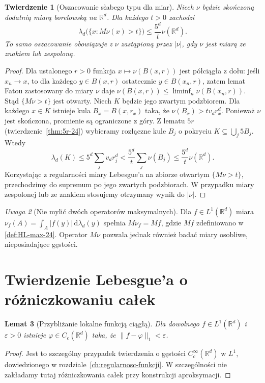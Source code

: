 \documentclass[11pt,a4paper,oneside]{book}
\numberwithin{equation}{chapter}
\theoremstyle{plain}
\newtheorem{twierdzenie}{Twierdzenie}[chapter]
\newtheorem{lemat}[twierdzenie]{Lemat}
\theoremstyle{definition}
\theoremstyle{remark}
\newtheorem{uwaga}[twierdzenie]{Uwaga}
\begin{document}
\begin{twierdzenie}[Oszacowanie słabego typu dla miar]
\label{thm:weak-measure-25}
Niech $\nu$ będzie skończoną dodatnią miarą borelowską
na $\mathbb R^d$. Dla każdego $t>0$ zachodzi
\begin{equation}\label{eq:weak-measure-25}
 \lambda_d\bigl(\{x:M\nu(x)>t\}\bigr)
 \le \frac{5^d}{t}\nu(\mathbb R^d).
\end{equation}
To samo oszacowanie obowiązuje z $\nu$ zastąpioną przez
$|\nu|$, gdy $\nu$ jest miarą ze znakiem lub zespoloną.
\end{twierdzenie}
\begin{proof}
Dla ustalonego $r>0$ funkcja $x\mapsto\nu(B(x,r))$
jest półciągła z dołu: jeśli $x_n\to x$, to dla każdego
$y\in B(x,r)$ ostatecznie $y\in B(x_n,r)$, zatem lemat
Fatou zastosowany do miary $\nu$ daje
$\nu(B(x,r))\le\liminf_n\nu(B(x_n,r))$. Stąd
$\{M\nu>t\}$ jest otwarty. Niech $K$ będzie jego
zwartym podzbiorem. Dla każdego $x\in K$ istnieje
kula $B_x=B(x,r_x)$ taka, że
$\nu(B_x)>tv_dr_x^d$. Ponieważ $\nu$ jest skończona,
promienie są ograniczone z góry. Z lematu $5r$
(twierdzenie~\ref{thm:5r-24}) wybieramy rozłączne
kule $B_j$ o pokryciu $K\subseteq\bigcup_j5B_j$.
Wtedy
\[
\lambda_d(K)\le5^d\sum_jv_dr_j^d
 <\frac{5^d}{t}\sum_j\nu(B_j)
 \le\frac{5^d}{t}\nu(\mathbb R^d).
\]
Korzystając z regularności miary Lebesgue'a na zbiorze
otwartym $\{M\nu>t\}$, przechodzimy do supremum po
jego zwartych podzbiorach. W przypadku miary zespolonej
lub ze znakiem stosujemy otrzymany wynik do $|\nu|$.
\end{proof}

\begin{uwaga}[Nie mylić dwóch operatorów maksymalnych]
Dla $f\in L^1(\mathbb R^d)$ miara
$\nu_f(A)=\int_A|f(y)|\,\mathrm d\lambda_d(y)$ spełnia
$M\nu_f=Mf$, gdzie $Mf$ zdefiniowano w
\ref{def:HL-max-24}. Operator $M\nu$ pozwala jednak
również badać miary osobliwe, nieposiadające gęstości.
\end{uwaga}

\section{Twierdzenie Lebesgue'a o różniczkowaniu całek}
\begin{lemat}[Przybliżanie lokalne funkcją ciągłą]
\label{lem:continuous-dense-25}
Dla dowolnego $f\in L^1(\mathbb R^d)$ i
$\varepsilon>0$ istnieje $\varphi\in C_c(\mathbb R^d)$
taka, że $\|f-\varphi\|_1<\varepsilon$.
\end{lemat}
\begin{proof}
Jest to szczególny przypadek twierdzenia o gęstości
$C_c^\infty(\mathbb R^d)$ w $L^1$, dowiedzionego w
rozdziale~\ref{ch:regularnosc-funkcji}. W szczególności nie
zakładamy tutaj różniczkowania całek przy konstrukcji
aproksymacji.
\end{proof}
\end{document}
